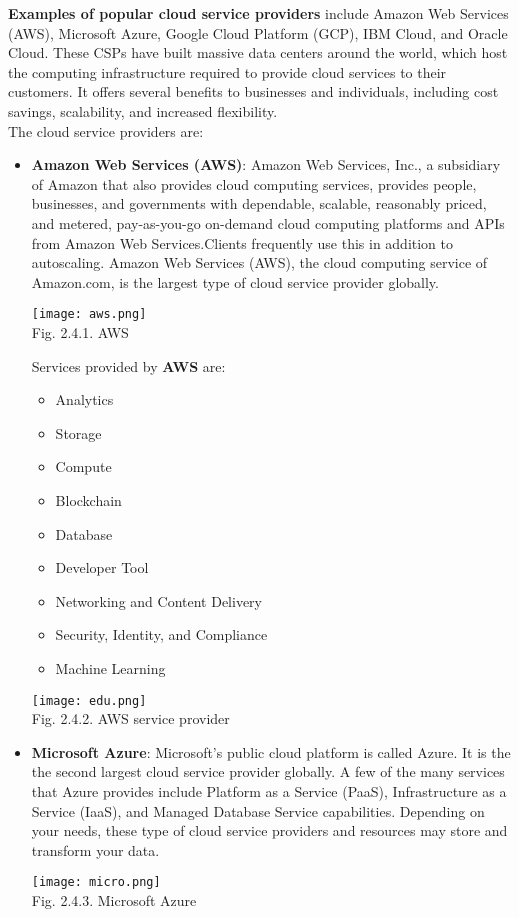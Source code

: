 \documentclass[12pt,a4paper]{article}
\begin{document}
\textbf{Examples of popular cloud service providers} include Amazon Web Services (AWS), Microsoft Azure, Google Cloud Platform (GCP), IBM Cloud, and Oracle Cloud. These CSPs have built massive data centers around the world, which host the computing infrastructure required to provide cloud services to their customers. It offers several benefits to businesses and individuals, including cost savings, scalability, and increased flexibility. \\

The cloud service providers are:\\
\begin{itemize}
\item \textbf{Amazon Web Services (AWS)}: Amazon Web Services, Inc., a subsidiary of Amazon that also provides cloud computing services, provides people, businesses, and governments with dependable, scalable, reasonably priced, and metered, pay-as-you-go on-demand cloud computing platforms and APIs from Amazon Web Services.Clients frequently use this in addition to autoscaling. Amazon Web Services (AWS), the cloud computing service of Amazon.com, is the largest type of cloud service provider globally.\\
\begin{center}
\texttt{[image: aws.png]}\\
Fig. 2.4.1. AWS
\end{center}
Services provided by \textbf{AWS} are:
\begin{itemize}
\item Analytics
\item Storage
\item Compute
\item Blockchain
\item Database
\item Developer Tool
\item Networking and Content Delivery
\item Security, Identity, and Compliance
\item Machine Learning
\end{itemize}
\begin{center}
\texttt{[image: edu.png]}\\
Fig. 2.4.2. AWS service provider
\end{center}
\item \textbf{Microsoft Azure}: Microsoft’s public cloud platform is called Azure. It is the the second largest cloud service provider globally. A few of the many services that Azure provides include Platform as a Service (PaaS), Infrastructure as a Service (IaaS), and Managed Database Service capabilities. Depending on your needs, these type of cloud service providers and resources may store and transform your data.\\
\begin{center}
\texttt{[image: micro.png]}\\
Fig. 2.4.3. Microsoft Azure
\end{center}


\end{itemize}
\end{document}

